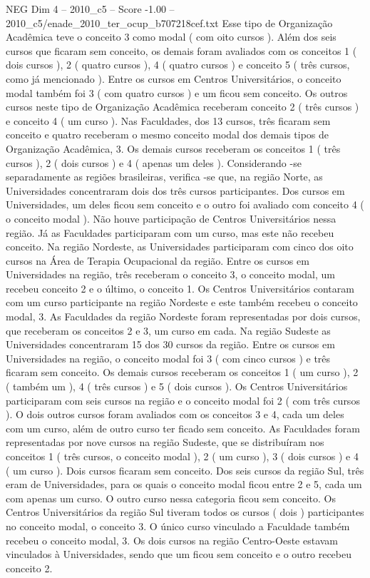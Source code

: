 \begin{textsample}{NEG Dim 4 – 2010\_c5 – Score -1.00 – 2010\_c5/enade\_2010\_ter\_ocup\_b707218cef.txt}
Esse tipo de Organização Acadêmica teve o conceito 3 como modal ( com oito cursos ).
Além dos seis cursos que ficaram sem conceito, os demais foram avaliados com os conceitos 1 ( dois cursos ), 2 ( quatro cursos ), 4 ( quatro cursos ) e conceito 5 ( três cursos, como já mencionado ).
Entre os cursos em Centros Universitários, o conceito modal também foi 3 ( com quatro cursos ) e um ficou sem conceito.
Os outros cursos neste tipo de Organização Acadêmica receberam conceito 2 ( três cursos ) e conceito 4 ( um curso ).
Nas Faculdades, dos 13 cursos, três ficaram sem conceito e quatro receberam o mesmo conceito modal dos demais tipos de Organização Acadêmica, 3.
Os demais cursos receberam os conceitos 1 ( três cursos ), 2 ( dois cursos ) e 4 ( apenas um deles ).
Considerando -se separadamente as regiões brasileiras, verifica -se que, na região Norte, as Universidades concentraram dois dos três cursos participantes.
Dos cursos em Universidades, um deles ficou sem conceito e o outro foi avaliado com conceito 4 ( o conceito modal ).
Não houve participação de Centros Universitários nessa região.
Já as Faculdades participaram com um curso, mas este não recebeu conceito.
Na região Nordeste, as Universidades participaram com cinco dos oito cursos na Área de Terapia Ocupacional da região.
Entre os cursos em Universidades na região, três receberam o conceito 3, o conceito modal, um recebeu conceito 2 e o último, o conceito 1.
Os Centros Universitários contaram com um curso participante na região Nordeste e este também recebeu o conceito modal, 3.
As Faculdades da região Nordeste foram representadas por dois cursos, que receberam os conceitos 2 e 3, um curso em cada.
Na região Sudeste as Universidades concentraram 15 dos 30 cursos da região.
Entre os cursos em Universidades na região, o conceito modal foi 3 ( com cinco cursos ) e três ficaram sem conceito.
Os demais cursos receberam os conceitos 1 ( um curso ), 2 ( também um ), 4 ( três cursos ) e 5 ( dois cursos ).
Os Centros Universitários participaram com seis cursos na região e o conceito modal foi 2 ( com três cursos ).
O dois outros cursos foram avaliados com os conceitos 3 e 4, cada um deles com um curso, além de outro curso ter ficado sem conceito.
As Faculdades foram representadas por nove cursos na região Sudeste, que se distribuíram nos conceitos 1 ( três cursos, o conceito modal ), 2 ( um curso ), 3 ( dois cursos ) e 4 ( um curso ).
Dois cursos ficaram sem conceito.
Dos seis cursos da região Sul, três eram de Universidades, para os quais o conceito modal ficou entre 2 e 5, cada um com apenas um curso.
O outro curso nessa categoria ficou sem conceito.
Os Centros Universitários da região Sul tiveram todos os cursos ( dois ) participantes no conceito modal, o conceito 3.
O único curso vinculado a Faculdade também recebeu o conceito modal, 3.
Os dois cursos na região Centro-Oeste estavam vinculados à Universidades, sendo que um ficou sem conceito e o outro recebeu conceito 2.

\end{textsample}
